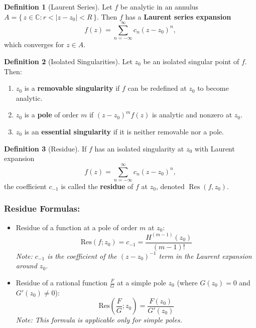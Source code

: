 \documentclass[12pt]{article}
\theoremstyle{definition} %
\newtheorem{definition}{Definition}
\theoremstyle{plain} %
\begin{document}
\begin{definition}[Laurent Series]
Let \(f\) be analytic in an annulus \(A = \{\,z \in \mathbb{C} : r < |z-z_0| < R\,\}\). Then \(f\) has a \textbf{Laurent series expansion}
\[
f(z) = \sum_{n=-\infty}^{\infty} c_n (z-z_0)^n,
\]
which converges for \(z \in A\).
\end{definition}

\begin{definition}[Isolated Singularities]
Let \(z_0\) be an isolated singular point of \(f\). Then:
\begin{enumerate}[label=(\roman*)]
    \item \(z_0\) is a \textbf{removable singularity} if \(f\) can be redefined at \(z_0\) to become analytic.
    \item \(z_0\) is a \textbf{pole} of order \(m\) if \((z-z_0)^m f(z)\) is analytic and nonzero at \(z_0\).
    \item \(z_0\) is an \textbf{essential singularity} if it is neither removable nor a pole.
\end{enumerate}
\end{definition}



\begin{definition}[Residue]
If \(f\) has an isolated singularity at \(z_0\) with Laurent expansion
\[
f(z) = \sum_{n=-\infty}^{\infty} c_n (z-z_0)^n,
\]
the coefficient \(c_{-1}\) is called the \textbf{residue} of \(f\) at \(z_0\), denoted \(\operatorname{Res}(f,z_0)\).
\end{definition}

\subsubsection*{Residue Formulas:}

\begin{itemize}
    \item Residue of a function at a pole of order $m$ at $z_0$:
    \[
    \text{Res}(f; z_0) = c_{-1} = \frac{H^{(m-1)}(z_0)}{(m-1)!}
    \]
    \textit{Note: $c_{-1}$ is the coefficient of the $(z - z_0)^{-1}$ term in the Laurent expansion around $z_0$.}

    \item Residue of a rational function $\frac{F}{G}$ at a simple pole $z_0$ (where $G(z_0) = 0$ and $G'(z_0) \neq 0$):
    \[
    \text{Res}\left(\frac{F}{G}; z_0\right) = \frac{F(z_0)}{G'(z_0)}
    \]
    \textit{Note: This formula is applicable only for simple poles.}
\end{itemize}
\end{document}
